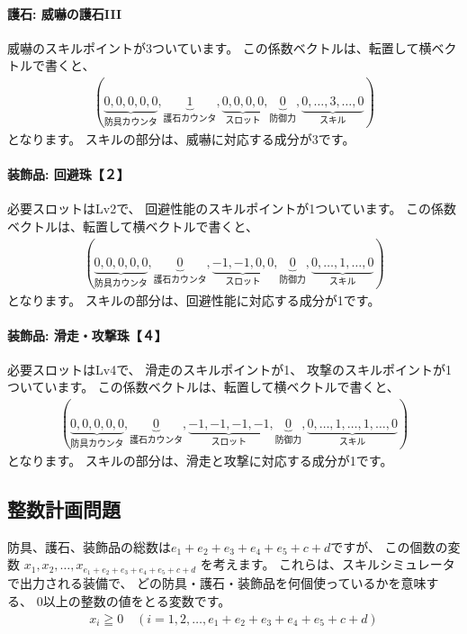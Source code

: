 \documentclass{jsarticle}
\begin{document}
\paragraph{護石: 威嚇の護石III}
威嚇のスキルポイントが3ついています。
%
この係数ベクトルは、転置して横ベクトルで書くと、
\begin{align*}
(
\underbrace{0,0,0,0,0}_{\text{防具カウンタ}},
\underbrace{1}_{\text{護石カウンタ}},
\underbrace{0,0,0,0}_{\text{スロット}},
\underbrace{0}_{\text{防御力}},
\underbrace{0,\ldots, 3, \ldots ,0}_{\text{スキル}}
)
\end{align*}
となります。
スキルの部分は、威嚇に対応する成分が3です。

\paragraph{装飾品: 回避珠【２】}
必要スロットはLv2で、
回避性能のスキルポイントが1ついています。
%
この係数ベクトルは、転置して横ベクトルで書くと、
\begin{align*}
(
\underbrace{0,0,0,0,0}_{\text{防具カウンタ}},
\underbrace{0}_{\text{護石カウンタ}},
\underbrace{-1,-1,0,0}_{\text{スロット}},
\underbrace{0}_{\text{防御力}},
\underbrace{0,\ldots, 1, \ldots ,0}_{\text{スキル}}
)
\end{align*}
となります。
スキルの部分は、回避性能に対応する成分が1です。

\paragraph{装飾品: 滑走・攻撃珠【４】}
必要スロットはLv4で、
滑走のスキルポイントが1、
攻撃のスキルポイントが1ついています。
%
この係数ベクトルは、転置して横ベクトルで書くと、
\begin{align*}
(
\underbrace{0,0,0,0,0}_{\text{防具カウンタ}},
\underbrace{0}_{\text{護石カウンタ}},
\underbrace{-1,-1,-1,-1}_{\text{スロット}},
\underbrace{0}_{\text{防御力}},
\underbrace{0,\ldots, 1, \ldots, 1, \ldots ,0}_{\text{スキル}}
)
\end{align*}
となります。
スキルの部分は、滑走と攻撃に対応する成分が1です。

\subsection{整数計画問題}

防具、護石、装飾品の総数は$e_1+e_2+e_3+e_4+e_5+c+d$ですが、
この個数の変数
$x_1, x_2, \ldots, x_{e_1+e_2+e_3+e_4+e_5+c+d}$
を考えます。
これらは、スキルシミュレータで出力される装備で、
どの防具・護石・装飾品を何個使っているかを意味する、
0以上の整数の値をとる変数です。
%
\begin{align*}
x_i \geqq 0 \quad (i = 1,2,\ldots, e_1+e_2+e_3+e_4+e_5+c+d)
\tag{条件1}
\end{align*}
\end{document}
